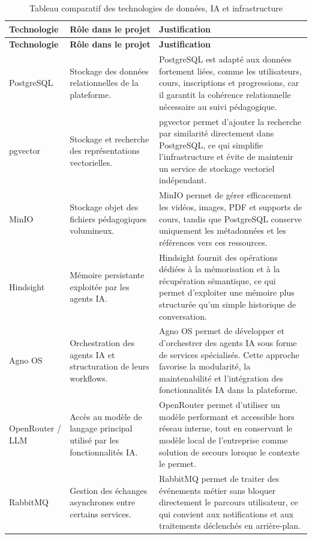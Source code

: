 \begingroup
\small
\renewcommand{\arraystretch}{1.18}
\begin{longtable}{|p{2.5cm}|p{4cm}|p{9cm}|}
\caption{Tableau comparatif des technologies de données, IA et infrastructure}
\label{tab:data_ai_infra_stack}\\
\hline
\textbf{Technologie} & \textbf{Rôle dans le projet} & \textbf{Justification} \\
\hline
\endfirsthead
\hline
\textbf{Technologie} & \textbf{Rôle dans le projet} & \textbf{Justification} \\
\hline
\endhead
PostgreSQL & Stockage des données relationnelles de la plateforme. & PostgreSQL est adapté aux données fortement liées, comme les utilisateurs, cours, inscriptions et progressions, car il garantit la cohérence relationnelle nécessaire au suivi pédagogique. \\
\hline
pgvector & Stockage et recherche des représentations vectorielles. & pgvector permet d'ajouter la recherche par similarité directement dans PostgreSQL, ce qui simplifie l'infrastructure et évite de maintenir un service de stockage vectoriel indépendant. \\
\hline
MinIO & Stockage objet des fichiers pédagogiques volumineux. & MinIO permet de gérer efficacement les vidéos, images, PDF et supports de cours, tandis que PostgreSQL conserve uniquement les métadonnées et les références vers ces ressources. \\
\hline
Hindsight & Mémoire persistante exploitée par les agents IA. & Hindsight fournit des opérations dédiées à la mémorisation et à la récupération sémantique, ce qui permet d'exploiter une mémoire plus structurée qu'un simple historique de conversation. \\
\hline
Agno OS & Orchestration des agents IA et structuration de leurs workflows. & Agno OS permet de développer et d'orchestrer des agents IA sous forme de services spécialisés. Cette approche favorise la modularité, la maintenabilité et l'intégration des fonctionnalités IA dans la plateforme. \\
\hline
OpenRouter / LLM & Accès au modèle de langage principal utilisé par les fonctionnalités IA. & OpenRouter permet d'utiliser un modèle performant et accessible hors réseau interne, tout en conservant le modèle local de l'entreprise comme solution de secours lorsque le contexte le permet. \\
\hline
RabbitMQ & Gestion des échanges asynchrones entre certains services. & RabbitMQ permet de traiter des événements métier sans bloquer directement le parcours utilisateur, ce qui convient aux notifications et aux traitements déclenchés en arrière-plan. \\

\end{longtable}
